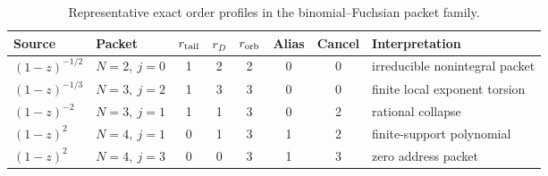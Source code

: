 \begin{table}[htbp]
\centering
\small
\caption{Representative exact order profiles in the binomial--Fuchsian packet family.}
\label{tab:block09-examples}
\begin{tabularx}{\textwidth}{@{}L{0.17\textwidth}L{0.13\textwidth}cccccY@{}}
\toprule
Source & Packet & $r_{\rm tail}$ & $r_D$ & $r_{\rm orb}$ & Alias & Cancel & Interpretation\\
\midrule
$(1-z)^{-1/2}$ & $N=2,\ j=0$ & 1 & 2 & 2 & 0 & 0 & irreducible nonintegral packet\\
$(1-z)^{-1/3}$ & $N=3,\ j=2$ & 1 & 3 & 3 & 0 & 0 & finite local exponent torsion\\
$(1-z)^{-2}$ & $N=3,\ j=1$ & 1 & 1 & 3 & 0 & 2 & rational collapse\\
$(1-z)^2$ & $N=4,\ j=1$ & 0 & 1 & 3 & 1 & 2 & finite-support polynomial\\
$(1-z)^2$ & $N=4,\ j=3$ & 0 & 0 & 3 & 1 & 3 & zero address packet\\
\bottomrule
\end{tabularx}
\end{table}
